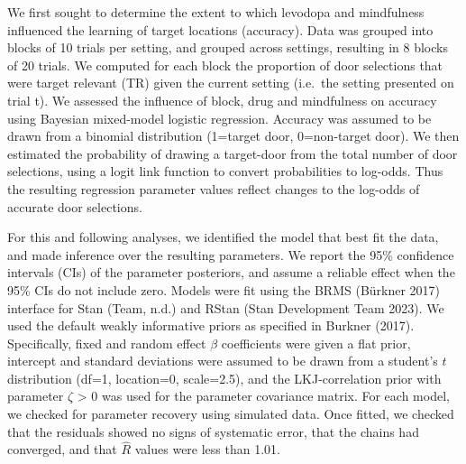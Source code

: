 \documentclass{article}
\begin{document}
We first sought to determine the extent to which levodopa and
mindfulness influenced the learning of target locations (accuracy). Data
was grouped into blocks of 10 trials per setting, and grouped across
settings, resulting in 8 blocks of 20 trials. We computed for each block
the proportion of door selections that were target relevant (TR) given
the current setting (i.e.~the setting presented on trial t). We assessed
the influence of block, drug and mindfulness on accuracy using Bayesian
mixed-model logistic regression. Accuracy was assumed to be drawn from a
binomial distribution (1=target door, 0=non-target door). We then
estimated the probability of drawing a target-door from the total number
of door selections, using a logit link function to convert probabilities
to log-odds. Thus the resulting regression parameter values reflect
changes to the log-odds of accurate door selections.

For this and following analyses, we identified the model that best fit
the data, and made inference over the resulting parameters. We report
the 95\% confidence intervals (CIs) of the parameter posteriors, and
assume a reliable effect when the 95\% CIs do not include zero. Models
were fit using the BRMS (Bürkner 2017) interface for Stan (Team, n.d.)
and RStan (Stan Development Team 2023). We used the default weakly
informative priors as specified in Burkner (2017). Specifically, fixed
and random effect \(\beta\) coefficients were given a flat prior,
intercept and standard deviations were assumed to be drawn from a
student's \(t\) distribution (df=1, location=0, scale=2.5), and the
LKJ-correlation prior with parameter \(\zeta\) \textgreater{} 0 was used
for the parameter covariance matrix. For each model, we checked for
parameter recovery using simulated data. Once fitted, we checked that
the residuals showed no signs of systematic error, that the chains had
converged, and that \(\hat{R}\) values were less than 1.01.
\end{document}
